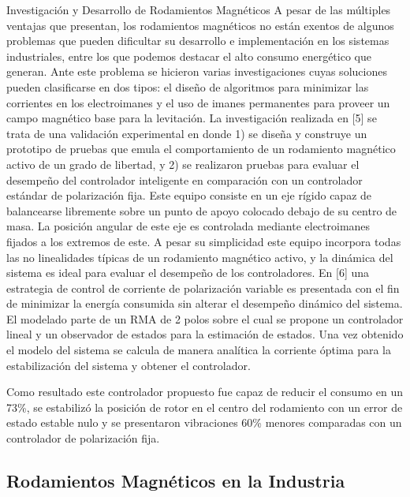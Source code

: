 Investigación y Desarrollo de Rodamientos Magnéticos 
A pesar de las múltiples ventajas que presentan, los rodamientos magnéticos no están exentos de algunos problemas que pueden dificultar su desarrollo e implementación en los sistemas industriales, entre los que podemos destacar el alto consumo energético que generan.
Ante este problema se hicieron varias investigaciones cuyas soluciones pueden clasificarse en dos tipos: el diseño de algoritmos para minimizar las corrientes en los electroimanes y el uso de imanes permanentes para proveer un campo magnético base para la levitación.
La investigación realizada en [5] se trata de una validación experimental en donde 1) se diseña y construye un prototipo de pruebas que emula el comportamiento de un rodamiento magnético activo de un grado de libertad, y 2) se realizaron pruebas para evaluar el desempeño del controlador inteligente en comparación con un controlador estándar de polarización fija.
Este equipo consiste en un eje rígido capaz de balancearse libremente sobre un punto de apoyo colocado debajo de su centro de masa. La posición angular de este eje es controlada mediante electroimanes fijados a los extremos de este. A pesar su simplicidad este equipo incorpora todas las no linealidades típicas de un rodamiento magnético activo, y la dinámica del sistema es ideal para evaluar el desempeño de los controladores. 
En [6] una estrategia de control de corriente de polarización variable es presentada con el fin de minimizar la energía consumida sin alterar el desempeño dinámico del sistema. El modelado parte de un RMA de 2 polos sobre el cual se propone un controlador lineal y un observador de estados para la estimación de estados.
Una vez obtenido el modelo del sistema se calcula de manera analítica la corriente óptima para la estabilización del sistema y obtener el controlador. 

Como resultado este controlador propuesto fue capaz de reducir el consumo en un 73\%, se estabilizó la posición de rotor en el centro del rodamiento con un error de estado estable nulo y se presentaron vibraciones 60\% menores comparadas con un controlador de polarización fija.

\subsection*{Rodamientos Magnéticos en la Industria}
\label{sec:intro:results}

